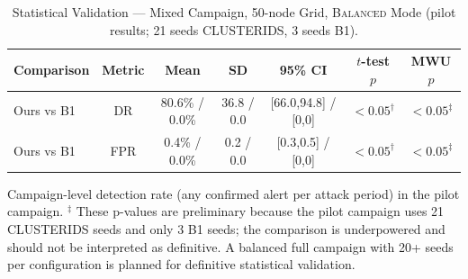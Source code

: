 \begin{table}[!t]
  \caption{Statistical Validation — Mixed Campaign, 50-node Grid, \textsc{Balanced} Mode (pilot results; 21 seeds CLUSTERIDS, 3 seeds B1).}
  \label{tab:statistics}
  \centering
  \scriptsize
  \setlength{\tabcolsep}{3pt}
  \renewcommand{\arraystretch}{1.08}
  \begin{tabular}{@{}lcccccc@{}}
    \toprule
    \textbf{Comparison} & \textbf{Metric} & \textbf{Mean} & \textbf{SD} & \textbf{95\% CI} & \textbf{$t$-test $p$} & \textbf{MWU $p$} \\
    \midrule
    Ours vs B1 & DR  & 80.6\% / 0.0\% & 36.8 / 0.0 & [66.0,94.8] / [0,0] & $<0.05^{\dagger}$ & $<0.05^{\ddagger}$ \\
    Ours vs B1 & FPR & 0.4\% / 0.0\% & 0.2 / 0.0 & [0.3,0.5] / [0,0] & $<0.05^{\dagger}$ & $<0.05^{\ddagger}$ \\
    \bottomrule
  \end{tabular}
  \vspace{2pt}
  \raggedright\scriptsize
  \dag{} Campaign-level detection rate (any confirmed alert per attack period) in the pilot campaign.
  $^{\ddagger}$ These p-values are preliminary because the pilot campaign uses 21 CLUSTERIDS seeds and only 3 B1 seeds; the comparison is underpowered and should not be interpreted as definitive. A balanced full campaign with 20+ seeds per configuration is planned for definitive statistical validation.
\end{table}
